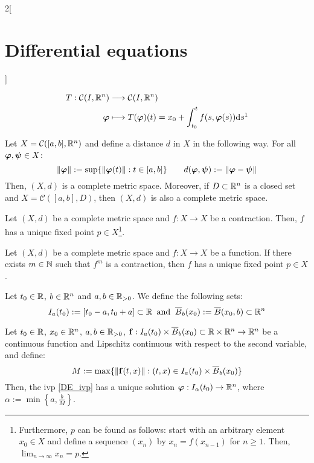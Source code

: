 \documentclass[../../../main.tex]{subfiles}
\begin{document}
\begin{multicols}{2}[\section{Differential equations}]
\begin{definition}
\begin{align*}
      T:\mathcal{C}(I,\RR^n)   & \longrightarrow\mathcal{C}(I,\RR^n)                                                                           \\
      \vectorfunction{\varphi} & \longmapsto T(\vectorfunction{\varphi})(t)=x_0+\int_{t_0}^tf(s,\vectorfunction{\varphi}(s))\dd s\footnotemark
    \end{align*}
  \end{definition}
  \begin{prop}
    Let $X=\mathcal{C}([a,b],\mathbb{R}^n)$ and define a distance $d$ in $X$ in the following way. For all $\boldsymbol{\mathrm{\varphi}},\boldsymbol{\mathrm{\psi}}\in X$: $$\|\boldsymbol{\mathrm{\varphi}}\|:=\sup\{\|\boldsymbol{\mathrm{\varphi}}(t)\|:t\in[a,b]\}\qquad d(\boldsymbol{\mathrm{\varphi}},\boldsymbol{\mathrm{\psi}}):=\|\boldsymbol{\mathrm{\varphi}}-\boldsymbol{\mathrm{\psi}}\|$$ Then, $(X,d)$ is a complete metric space. Moreover, if $D\subset\mathbb{R}^n$ is a closed set and $X=\mathcal{C}([a,b],D)$, then $(X,d)$ is also a complete metric space.
  \end{prop}
  \begin{theorem}
    Let $(X,d)$ be a complete metric space and $f:X\rightarrow X$ be a contraction. Then, $f$ has a unique fixed point $p\in X$\footnote{Furthermore, $p$ can be found as follows: start with an arbitrary element$x_0\in X$ and define a sequence $(x_n)$ by $x_n=f(x_{n-1})$ for $n\geq 1$. Then, $\displaystyle\lim_{n\to\infty} x_n=p$.}.
  \end{theorem}
  \begin{corollary}
    Let $(X,d)$ be a complete metric space and $f:X\rightarrow X$ be a function. If there exists $m\in\mathbb{N}$ such that $f^m$ is a contraction, then $f$ has a unique fixed point $p\in X$.
  \end{corollary}
  \begin{definition}
    Let $t_0\in\mathbb{R}$, $b\in\mathbb{R}^n$ and $a,b\in\mathbb{R}_{>0}$. We define the following sets: $$I_a(t_0):=[t_0-a,t_0+a]\subset\mathbb{R}\;\;\text{and}\;\;\overline{B}_{b}(x_0):=\overline{B}(x_0,b)\subset\mathbb{R}^n$$
  \end{definition}
  \begin{theorem}\label{DE_picard}
    Let $t_0\in\mathbb{R}$, $x_0\in\mathbb{R}^n$, $a,b\in\mathbb{R}_{>0}$, $\boldsymbol{\mathrm{f}}:I_a(t_0)\times\overline{B}_{b}(x_0)\subset\mathbb{R}\times\mathbb{R}^n\rightarrow\mathbb{R}^n$ be a continuous function and Lipschitz continuous with respect to the second variable, and define: $$M:=\max\{\|\boldsymbol{\mathrm{f}}(t,x)\|:(t,x)\in I_a(t_0)\times\overline{B}_{b}(x_0)\}$$ Then, the ivp \eqref{DE_ivp} has a unique solution $\boldsymbol{\mathrm{\varphi}}:I_\alpha(t_0)\rightarrow\mathbb{R}^n$, where $\alpha:=\min\left\{a,\frac{b}{M}\right\}$.

\end{theorem}
\end{multicols}
\end{document}
